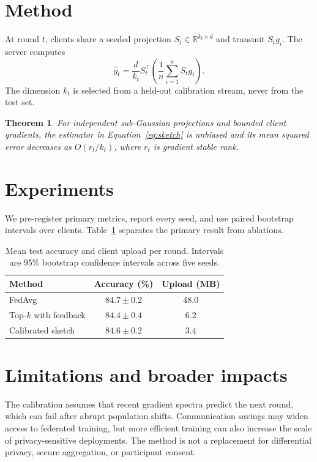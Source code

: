 \documentclass[10pt]{article}
\newtheorem{theorem}{Theorem}
\begin{document}
\section{Method}
At round $t$, clients share a seeded projection
$S_t\in\mathbb{R}^{k_t\times d}$ and transmit $S_tg_i$. The server computes
\begin{equation}
  \widehat g_t=\frac{d}{k_t}S_t^\top
  \left(\frac{1}{n}\sum_{i=1}^{n}S_tg_i\right).
  \label{eq:sketch}
\end{equation}
The dimension $k_t$ is selected from a held-out calibration stream, never from
the test set.

\begin{theorem}
For independent sub-Gaussian projections and bounded client gradients,
the estimator in Equation~\ref{eq:sketch} is unbiased and its mean squared
error decreases as $O(r_t/k_t)$, where $r_t$ is gradient stable rank.
\end{theorem}

\section{Experiments}
We pre-register primary metrics, report every seed, and use paired bootstrap
intervals over clients. Table~\ref{tab:results} separates the primary result
from ablations.

\begin{table}[h]
\caption{Mean test accuracy and client upload per round. Intervals are 95\%
bootstrap confidence intervals across five seeds.}
\label{tab:results}
\centering
\small
\begin{tabular}{lcc}
\toprule
Method & Accuracy (\%) & Upload (MB) \\
\midrule
FedAvg & $84.7\pm0.2$ & 48.0 \\
Top-$k$ with feedback & $84.4\pm0.4$ & 6.2 \\
Calibrated sketch & $\mathbf{84.6\pm0.2}$ & $\mathbf{3.4}$ \\
\bottomrule
\end{tabular}
\end{table}

\section{Limitations and broader impacts}
The calibration assumes that recent gradient spectra predict the next round,
which can fail after abrupt population shifts. Communication savings may widen
access to federated training, but more efficient training can also increase
the scale of privacy-sensitive deployments. The method is not a replacement
for differential privacy, secure aggregation, or participant consent.
\end{document}
